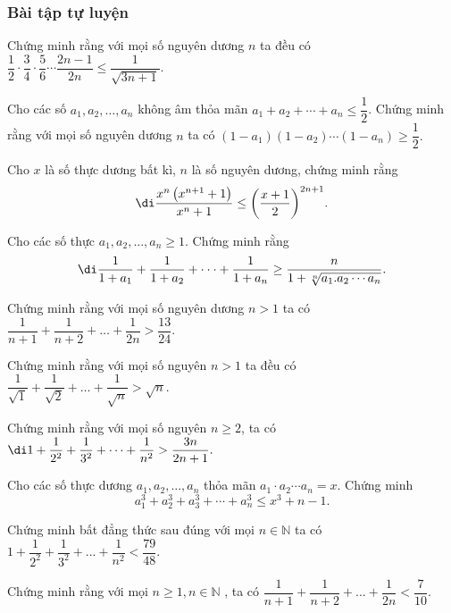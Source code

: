 \subsubsection*{Bài tập tự luyện}
\setcounter{bai}{0}
\begin{bai}
Chứng minh rằng với mọi số nguyên dương $n$ ta đều có $\dfrac{1}{2}\cdot\dfrac{3}{4}\cdot\dfrac{5}{6}\cdots\dfrac{2n-1}{2n} \leq \dfrac{1}{\sqrt{3n+1}}.$
\end{bai}
\begin{bai}
	Cho các số $a_1, a_2, \ldots,a_n$ không âm thỏa mãn $a_1+a_2+\cdots+a_n \leq \dfrac{1}{2}$. Chứng minh rằng với mọi số nguyên dương $n$ ta có $(1-a_1)(1-a_2)\cdots(1-a_n) \geq \dfrac{1}{2}.$
\end{bai}
\begin{bai}
Cho $x$ là số thực dương bất kì, $n$ là số nguyên dương, chứng minh rằng
	$$\di\dfrac{{{x}^{n}}\left( {{x}^{n+1}}+1 \right)}{{{x}^{n}}+1}\le {{\left( \dfrac{x+1}{2} \right)}^{2n+1}}.$$
\end{bai}
\begin{bai}
Cho các số thực ${{a}_{1}},{{a}_{2}},...,{{a}_{n}}\ge 1$. Chứng minh rằng 
$$\di\dfrac{1}{1+{{a}_{1}}}+\dfrac{1}{1+{{a}_{2}}}+\cdot \cdot \cdot +\dfrac{1}{1+{{a}_{n}}}\ge \dfrac{n}{1+\sqrt[n]{{{a}_{1}}.{{a}_{2}}\cdots{{a}_{n}}}}.$$
\end{bai}
\begin{bai}
Chứng minh rằng với mọi số nguyên dương $n>1$ ta có $\dfrac{1}{n+1}+\dfrac{1}{n+2}+\ldots+\dfrac{1}{2n}>\dfrac{13}{24}.$
\end{bai}
\begin{bai}
Chứng minh rằng với mọi số nguyên $n>1$ ta đều có $\dfrac{1}{\sqrt{1}}+\dfrac{1}{\sqrt{2}}+\ldots+\dfrac{1}{\sqrt{n}}>\sqrt{n}.$
\end{bai}
\begin{bai}
Chứng minh rằng với mọi số nguyên $n\ge 2$, ta có
	$\di 1 + \dfrac{1}{{{2^2}}} + \dfrac{1}{{{3^2}}} + \cdots + \dfrac{1}{{{n^2}}} > \dfrac{{3n}}{{2n + 1}}.$
\end{bai}
\begin{bai}
	Cho các số thực dương $a_1,{a_2},...,{a_n}$ thỏa mãn $a_1\cdot a_2\cdots a_n=x$. Chứng minh $$a_1^3+a_2^3+a_3^3+\cdots+a_n^3\le{x^3}+n-1.$$
\end{bai}
\begin{bai}
Chứng minh bất đẳng thức sau đúng với mọi $n\in\mathbb{N}$ ta có 
	$1+\dfrac{1}{2^2}+\dfrac{1}{3^2}+...+\dfrac{1}{n^2}<\dfrac{79}{48}$.
\end{bai}
\begin{bai}
Chứng minh rằng với mọi $n\ge 1,n\in\mathbb{N}$ , ta có
	$\dfrac{1}{n+1}+\dfrac{1}{n+2}+...+\dfrac{1}{2n}<\dfrac{7}{10}$.
\end{bai}
